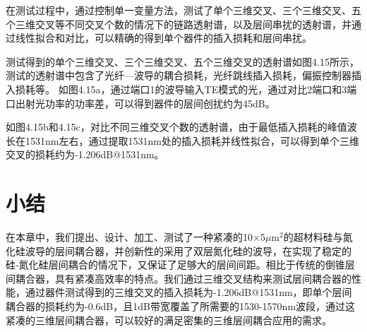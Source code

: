 在测试过程中，通过控制单一变量方法，测试了单个三维交叉、三个三维交叉、五个三维交叉等不同交叉个数的情况下的链路透射谱，以及层间串扰的透射谱，并通过线性拟合和对比，可以精确的得到单个器件的插入损耗和层间串扰。

 
测试得到的单个三维交叉、三个三维交叉、五个三维交叉的透射谱如图4.15所示，测试的透射谱中包含了光纤—波导的耦合损耗，光纤跳线插入损耗，偏振控制器插入损耗等。
如图4.15a，通过端口1的波导输入TE模式的光，通过对比2端口和3端口出射光功率的功率差，可以得到器件的层间创扰约为45dB。

如图4.15b和4.15c，对比不同三维交叉个数的透射谱，由于最低插入损耗的峰值波长在1531nm左右，通过提取1531nm处的插入损耗并线性拟合，可以得到单个三维交叉的损耗约为-1.206dB@1531nm。

\section{小结}

在本章中，我们提出、设计、加工、测试了一种紧凑的10×5$\mu$m$^2$的超材料硅与氮化硅波导的层间耦合器，并创新性的采用了双层氮化硅的波导，在实现了稳定的硅-氮化硅层间耦合的情况下，又保证了足够大的层间间距。相比于传统的倒锥层间耦合器，具有紧凑高效率的特点。我们通过三维交叉结构来测试层间耦合器的性能，通过器件测试得到的三维交叉的插入损耗为-1.206dB@1531nm，即单个层间耦合器的损耗约为-0.6dB，且1dB带宽覆盖了所需要的1530-1570nm波段，通过这紧凑的三维层间耦合器，可以较好的满足密集的三维层间耦合应用的需求。\cite{Xu:19}
